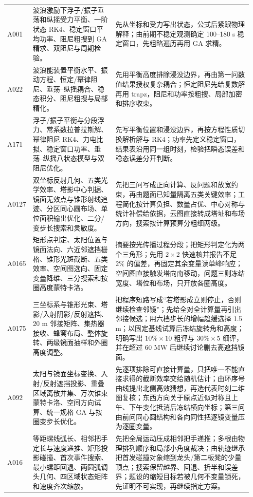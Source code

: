\documentclass[UTF8,a4paper,12pt]{ctexart}
\begin{document}
\begin{longtable}{p{1.4cm}p{5.2cm}p{7.0cm}}
A001 & 波浪激励下浮子/振子垂荡和纵摇受力平衡、一阶状态 RK4、稳定窗口平均功率、阻尼粗搜到 GA 精求、双阻尼与周期检验。 &
先从坐标和受力写出状态，公式后紧跟物理解释；由前期不稳定观测确定 100--180 s 稳定窗口，先粗略遍历再用 GA 求精。\\
A022 & 波浪能装置平衡水平、振动方程、恒定/幂律阻尼、垂荡--纵摇耦合、稳态积分、阻尼粗搜与局部精化。 &
先用平衡高度排除浸没边界，再由第一问数值结果授权复杂耦合；恒定阻尼先给复数解再用 trapz，阻尼和功率按粗搜、局部加密和排序收束。\\
A171 & 浮子/振子平衡与分段浮力、常系数拉普拉斯解、幂律阻尼 RK4、力电比拟、稳定窗口功率、垂荡--纵摇八状态模型与双阻尼优化。 &
先写平衡位置和浸没边界，再按方程性质切换解析解与 RK4；功率先定义稳定窗口，结果表沿用同一组时刻，检验把瞬态误差和稳态误差分开判断。\\
A0127 & 双坐标反射几何、五类光学效率、塔影中心判据、镜面无效点与锥形射线追迹、分区同心圆布场、单位面积输出优化、二分/变步长搜索和灵敏度。 &
先把三问写成正向计算、反问题和放宽约束，再由题面已知量隔离五类关键效率；工程简化按计算负担、数量占优、中心对称与统计补偿给依据，云图直接转成塔址和布场方向，搜索按计算预算分粗细两级。\\
A0165 & 矩形点判定、太阳位置与镜面法向、六近邻遮挡栅格、锥形光斑截断、五类效率、空间图选向、固定变量降维、三分搜索和按圈高度蒙特卡洛。 &
摘要按光传播过程分段；把矩形判定化为两个三角形；先用 $2\times2$ 快速核并报告不足 $2\%$ 的偏差，再固定其余变量读单峰响应；空间图直接触发塔向南移动，问题三则冻结宽度、塔位和布场，只开放各圈高度。\\
A0175 & 三坐标系与锥形光束、塔影/入射阴影/反射遮挡、20 m 邻接矩阵、集热器接收、蜂窝布局、整体旋转、两级镜面抽样和外圈高度调整。 &
把程序短路写成“若塔影成立则停止，否则继续检查邻镜”；先给全对全计算量再引出邻接候选；用六档步长的增幅趋缓选择 1.5 m；以固定基线试算后冻结旋转角和高度；明确写出 $10\%\times10$ 粗评与 $30\%\times5$ 细评，并在超过 60 MW 后继续讨论删去高遮挡镜面。\\
A092 & 太阳与镜面坐标变换、入射/反射遮挡投影、重叠区域离散并集、万次锥束蒙特卡洛、空间方向试算、统一规格 GA 与按圈变步长优化。 &
先逐项排除可直接计算量，只把唯一不能直接求得的截断效率交给随机估计；由环序号曲线提出北侧高效猜想，再选代表时刻二维图复核；东西方向关于原点近似对称且上午、下午变化抵消后冻结横向坐标；第三问由前问同心圆结构和各向同性把逐镜变量压为逐圈变量。\\
A016 & 等距螺线弧长、相邻把手定长与速度递推、矩形投影碰撞、首次事件搜索、最小螺距回退、两圆弧调头几何、四区域状态矩阵和速度齐次缩放。 &
先把全局运动压成相邻把手递推；多根由物理排列顺序和局部小角度裁决；由轨迹继承把首发碰撞对象缩到龙头/第二板凳的少量顶点；搜索保留越界、回退、折半和误差界；题设的缩短目标若被几何不变量锁死，先证明不可实现，再继续指定方案。\\

\end{longtable}
\end{document}
